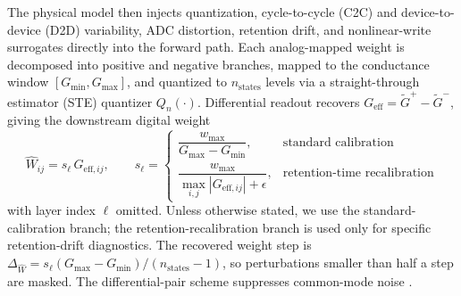 The physical model then injects quantization, cycle-to-cycle (C2C) and device-to-device (D2D) variability, ADC distortion, retention drift, and nonlinear-write surrogates directly into the forward path. Each analog-mapped weight is decomposed into positive and negative branches, mapped to the conductance window $[G_{\min}, G_{\max}]$, and quantized to $n_{\mathrm{states}}$ levels via a straight-through estimator (STE) quantizer $Q_{n}(\cdot)$. Differential readout recovers $G_{\mathrm{eff}}=\tilde{G}^{+}-\tilde{G}^{-}$, giving the downstream digital weight
\begin{equation}
    \hat{W}_{ij}=s_{\ell}\,G_{\mathrm{eff},ij},
    \qquad
    s_{\ell}=
    \begin{cases}
        \dfrac{w_{\max}}{G_{\max}-G_{\min}}, & \text{standard calibration} \\[6pt]
        \dfrac{w_{\max}}{\max_{i,j}|G_{\mathrm{eff},ij}|+\epsilon}, & \text{retention-time recalibration}
    \end{cases}
\label{eq:scale-recovery}
\end{equation}
with layer index $\ell$ omitted. Unless otherwise stated, we use the standard-calibration branch; the retention-recalibration branch is used only for specific retention-drift diagnostics. The recovered weight step is $\Delta_{\hat{W}}=s_{\ell}(G_{\max}-G_{\min})/(n_{\mathrm{states}}-1)$, so perturbations smaller than half a step are masked. The differential-pair scheme suppresses common-mode noise \citep{wei2020voltagedifferential,kim2024sttmram}.

